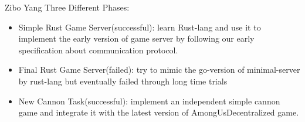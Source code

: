 \documentclass{beamer}
\begin{document}
\begin{frame}{Zibo Yang}
Three Different Phases:
\begin{itemize}
\item Simple Rust Game Server(successful): learn Rust-lang and use it to implement the early version of game server by following our early specification about communication protocol.
\item Final Rust Game Server(failed): try to mimic the go-version of minimal-server by rust-lang but eventually failed through long time trials
\item New Cannon Task(successful): implement an independent simple cannon game and integrate it with the latest version of AmongUsDecentralized game.
\end{itemize}
\end{frame}
\end{document}
